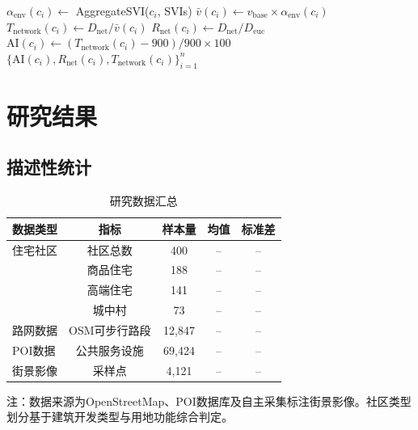 \documentclass[10pt,conference]{IEEEtran}
\begin{document}
\begin{algorithm}
\caption{可达性幻觉指数计算流程}
\begin{algorithmic}[1]
        \State $\alpha_{\text{env}}(c_i) \gets$ AggregateSVI($c_i$, SVIs) 
        \State $\bar{v}(c_i) \gets v_{\text{base}} \times \alpha_{\text{env}}(c_i)$ 
        \State $T_{\text{network}}(c_i) \gets D_{\text{net}} / \bar{v}(c_i)$ 
        \State $R_{\text{net}}(c_i) \gets D_{\text{net}} / D_{\text{euc}}$ 
        \State $\text{AI}(c_i) \gets (T_{\text{network}}(c_i) - 900) / 900 \times 100$ 
    \EndFor
    \State \Return $\{\text{AI}(c_i), R_{\text{net}}(c_i), T_{\text{network}}(c_i)\}_{i=1}^{n}$
\EndProcedure
\end{algorithmic}
\end{algorithm}

\section{研究结果}
\label{sec:results}

\subsection{描述性统计}

\begin{table}[htbp]
\caption{研究数据汇总}
\label{tab:data_summary}
\begin{center}
\begin{threeparttable}
\begin{tabular}{lcccc}
\toprule
数据类型 & 指标 & 样本量 & 均值 & 标准差 \\
\midrule
住宅社区 & 社区总数 & 400 & -- & -- \\
 & 商品住宅 & 188 & -- & -- \\
 & 高端住宅 & 141 & -- & -- \\
 & 城中村 & 73 & -- & -- \\
路网数据 & OSM可步行路段 & 12,847 & -- & -- \\
POI数据 & 公共服务设施 & 69,424 & -- & -- \\
街景影像 & 采样点 & 4,121 & -- & -- \\
\bottomrule
\end{tabular}
\begin{tablenotes}
\item 注：数据来源为OpenStreetMap、POI数据库及自主采集标注街景影像。社区类型划分基于建筑开发类型与用地功能综合判定。
\end{tablenotes}
\end{threeparttable}
\end{center}
\end{table}
\end{document}
